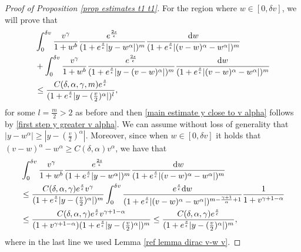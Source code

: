 \documentclass[11pt]{article}
\numberwithin{equation}{section}
\newcommand{\der}{\textup{d}}
\begin{document}
\begin{proof}[Proof of Proposition 
\ref{prop estimates t1 t1}]
For the region where $w\in[0,\delta v]$, we will prove that
\begin{align*}
    &\int_{0}^{\delta v}\frac{v^{\gamma}}{1+w^{b}}\frac{e^{\frac{2s}{\epsilon}}}{(1+e^{\frac{s}{\epsilon}}|y-w^{\alpha}|)^{m}}\frac{\der w}{(1+e^{\frac{s}{\epsilon}}|(v-w)^{\alpha}-w^{\alpha}|)^{m}}\nonumber\\
&+\int_{0}^{\delta v}\frac{v^{\gamma}}{1+w^{b}}\frac{e^{\frac{2s}{\epsilon}}}{(1+e^{\frac{s}{\epsilon}}|y-(v-w)^{\alpha}|)^{m}}\frac{\der w}{(1+e^{\frac{s}{\epsilon}}|(v-w)^{\alpha}-w^{\alpha}|)^{m}}\\
&\leq \frac{C(\delta,\alpha,\gamma,m) e^{\frac{s}{\epsilon}}}{(1+e^{\frac{s}{\epsilon}}|y-(\frac{v}{2})^{\alpha}|)^{l}},
\end{align*}
for some $l=\frac{m}{2}>2$ as before and then \eqref{main estimate y close to v alpha} follows by \eqref{first step y greater v alpha}. We can assume without loss of generality that $|y-w^{\alpha}|\geq |y-(\frac{v}{2})^{\alpha}|$. 
  Moreover, since when $w\in[0,\delta v]$ it holds that $(v-w)^{\alpha}-w^{\alpha}\geq C(\delta,\alpha) v^{\alpha}$, we have that
    \begin{align*}
&    \int_{0}^{\delta v}\frac{v^{\gamma}}{1+w^{b}}\frac{e^{\frac{2s}{\epsilon}}}{(1+e^{\frac{s}{\epsilon}}|y-w^{\alpha}|)^{m}}\frac{\der w}{(1+e^{\frac{s}{\epsilon}}|(v-w)^{\alpha}-w^{\alpha}|)^{m}}\\
         &\leq \frac{C(\delta,\alpha,\gamma) e^{\frac{s}{\epsilon}}v^{\gamma}}{(1+e^{\frac{s}{\epsilon}}|y-(\frac{v}{2})^{\alpha}|)^{m}}  \int_{0}^{\delta v}\frac{e^{\frac{s}{\epsilon}}\der w}{(1+e^{\frac{s}{\epsilon}}|(v-w)^{\alpha}-w^{\alpha}|)^{m-\frac{\gamma+1}{\alpha}+1}}\frac{1}{1+v^{\gamma+1-\alpha}}\\
         &\leq \frac{C(\delta,\alpha,\gamma) e^{\frac{s}{\epsilon}}v^{\gamma+1-\alpha}}{(1+v^{\gamma+1-\alpha})(1+e^{\frac{s}{\epsilon}}|y-(\frac{v}{2})^{\alpha}|)^{m}}  \leq \frac{C(\delta,\alpha,\gamma) e^{\frac{s}{\epsilon}}}{(1+e^{\frac{s}{\epsilon}}|y-(\frac{v}{2})^{\alpha}|)^{m}},  
  \end{align*}
  where in the last line we used Lemma \ref{ref lemma dirac v-w v}.


\end{proof}
\end{document}
